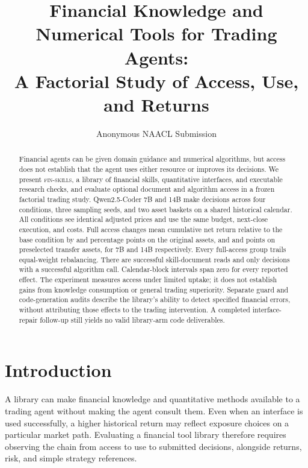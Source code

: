 \documentclass[11pt]{article}
\title{Financial Knowledge and Numerical Tools for Trading Agents:\\
A Factorial Study of Access, Use, and Returns}
\author{Anonymous NAACL Submission}
\date{}
\begin{document}
\maketitle
\nolinenumbers
\begin{abstract}
Financial agents can be given domain guidance and numerical algorithms, but access does
not establish that the agent uses either resource or improves its decisions. We present
\textsc{fin-skills}, a library of financial skills, quantitative interfaces, and executable
research checks, and evaluate optional document and algorithm access in a frozen factorial
trading study. Qwen2.5-Coder 7B and 14B make \FTDecisions{} decisions across four conditions,
three sampling seeds, and two asset baskets on a shared historical calendar. All conditions
see identical adjusted prices and use the same budget, next-close execution, and costs.
Full access changes mean cumulative net return relative to the base condition by
\FTOriginalSevenDifference{} and \FTOriginalFourteenDifference{} percentage points on the
original assets, and \FTTransferSevenDifference{} and \FTTransferFourteenDifference{} points
on preselected transfer assets, for 7B and 14B respectively. Every full-access group trails
equal-weight rebalancing. There are \FTSkillReads{} successful skill-document reads and only
\FTAlgorithmDecisions{} decisions with a successful algorithm call. Calendar-block intervals
span zero for every reported effect. The experiment measures access under limited uptake;
it does not establish gains from knowledge consumption or general trading superiority.
Separate guard and code-generation audits describe the library's ability to detect specified
financial errors, without attributing those effects to the trading intervention. A completed
interface-repair follow-up still yields no valid library-arm code deliverables.
\end{abstract}

\section{Introduction}
A library can make financial knowledge and quantitative methods available to a trading
agent without making the agent consult them. Even when an interface is used successfully,
a higher historical return may reflect exposure choices on a particular market path.
Evaluating a financial tool library therefore requires observing the chain from access to
use to submitted decisions, alongside returns, risk, and simple strategy references.
\end{document}
